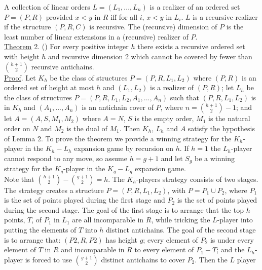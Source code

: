 \documentclass[twoside]{article}
\begin{document}
A collection of linear orders $L = (L_1,..., L_n)$    is a realizer of an ordered set   $P = (P, R)$   provided   $x<y$ in $R$   iff for all $i$, $x<y$ in $L_i$.   $L$   is a recursive   realizer if the structure  $(P,R,C)$ is recursive.    The (recursive) dimension of   $P$   is the least number of linear extensions in a (recursive) realizer of   $P$.\\
\newline
\underline{Theorem} 2.    (\cite{Szemeredi82})     For every positive integer   $h$  there exists a
recursive ordered set with height   $h$   and recursive dimension 2 which cannot
be covered by fewer than $\binom{h+1}{2}$	recursive antichains.\\
\newline
\underline{Proof}.    Let $K_h$	be the class of structures   $P = (P,R,L_1,L_2)$   where   $(P,R)$ is
an ordered set of height at most $h$   and  $(L_1, L_2)$   is a realizer of   $(P,R)$; let
$L_h$   be the class of structures $\bar{P} = (P,R,L_1,L_2,A_1,...,A_n)$   such that
$(P,R,L_1,L_2)$   is in	$K_h$ and   $(A_1,...,A_n)$ is an antichain cover of   $P$, where
$n = \binom{h+1}{2}-1$; and let $A = (A,S,M_1,M_2)$ where $A = N$, $S$ is the empty order, $M_1$
is the natural order on   $N$   and	$M_2$ is the dual of  $M_1$.   Then   $K_h$, $L_h$ and
$A$   satisfy the hypothesis of Lemma 2.   To prove the theorem we provide a winning strategy for the   $K_h$-player in the  $K_h - L_h$   expansion game by recursion on   $h$.    If   $h=1$    the   $L_h$-player cannot respond to any move, so
assume $h = g+1$ and   let  $S_g$     be a winning strategy for the   $K_g$-player in the $K_g - L_g$   expansion game.\\
Note that	$\binom{h+1}{2}	- \binom{g+1}{2} = h$. The   $K_h$-players     strategy consists of two
stages.    The strategy creates a structure   $P = (P,R,L_1,L_2)$, with   $P = P_1 \cup P_2$, where   $P_1$ is the set of points played during the first stage and   $P_2$   is the set of points played during the second stage.   
The goal of the first stage is to arrange that the top   $h$   points, $T$, of   $P_1$   in   $L_1$   are all incomparable in $R$, while tricking the   $L$-player into putting the elements of   $T$   into $h$ distinct antichains.   
The goal of the second stage is to arrange that: $(P2,R,P2)$   has height   $g$; every element of   $P_2$   is under every element
of $T$ in   $R$   and incomparable in   $R$  to every element of   $P_1 - T$;   and the $L_h$-player
\newpage
%
%
\noindent is forced to use $\binom{g+1}{2}$	distinct antichains to cover $P_2$.	Then the   $L$ player
\end{document}

